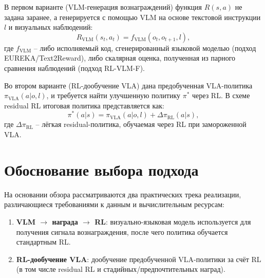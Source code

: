     В первом варианте (VLM-генерация вознаграждений) функция $R(s, a)$ не задана заранее, а генерируется с помощью VLM на основе текстовой инструкции $l$ и визуальных наблюдений:
\begin{equation}
\label{eq:vlm_reward}
    R_{\text{VLM}}(s_t, a_t) = f_{\text{VLM}}(o_t, o_{t+1}, l),
\end{equation}
где $f_{\text{VLM}}$ -- либо исполняемый код, сгенерированный языковой моделью (подход EUREKA/Text2Reward), либо скалярная оценка, полученная из парного сравнения наблюдений (подход RL-VLM-F).

    Во втором варианте (RL-дообучение VLA) дана предобученная VLA-политика $\pi_{\text{VLA}}(a|o, l)$, и требуется найти улучшенную политику $\pi^*$ через RL. В схеме residual RL итоговая политика представляется как:
\begin{equation}
\label{eq:residual}
    \pi^*(a|s) = \pi_{\text{VLA}}(a|o, l) + \Delta\pi_{\text{RL}}(a|s),
\end{equation}
где $\Delta\pi_{\text{RL}}$ -- лёгкая residual-политика, обучаемая через RL при замороженной VLA.

\section{Обоснование выбора подхода}
\label{sec:approach}

    На основании обзора рассматриваются два практических трека реализации, различающиеся требованиями к данным и вычислительным ресурсам:
    \begin{enumerate}
        \item \textbf{VLM $\rightarrow$ награда $\rightarrow$ RL}: визуально-языковая модель используется для получения сигнала вознаграждения, после чего политика обучается стандартным RL.
        \item \textbf{RL-дообучение VLA}: дообучение предобученной VLA-политики за счёт RL (в том числе residual RL и стадийных/предпочтительных наград).
    \end{enumerate}

